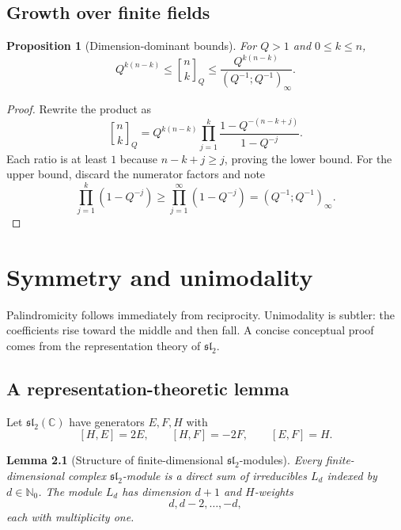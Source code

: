 \documentclass[11pt,oneside,openany]{book}
\newtheorem{lemma}[lemma]{Lemma}
\newtheorem{proposition}[proposition]{Proposition}
\theoremstyle{definition}
\theoremstyle{remark}
\newcommand{\Qbinom}[3]{\genfrac{[}{]}{0pt}{}{#1}{#2}_{#3}}
\newcommand{\C}{\mathbb C}
\newcommand{\N}{\mathbb N}
\begin{document}
\section{Growth over finite fields}

\begin{proposition}[Dimension-dominant bounds]\label{prop:qbinom-growth}
For $Q>1$ and $0\le k\le n$,
\[
 Q^{k(n-k)}
 \le \Qbinom nkQ
 \le \frac{Q^{k(n-k)}}{(Q^{-1};Q^{-1})_\infty}.
\]
\end{proposition}

\begin{proof}
Rewrite the product as
\[
 \Qbinom nkQ
 =Q^{k(n-k)}
 \prod_{j=1}^{k}\frac{1-Q^{-(n-k+j)}}{1-Q^{-j}}.
\]
Each ratio is at least $1$ because $n-k+j\ge j$, proving the lower bound.  For the upper bound, discard the numerator factors and note
\[
 \prod_{j=1}^{k}(1-Q^{-j})\ge\prod_{j=1}^{\infty}(1-Q^{-j})=(Q^{-1};Q^{-1})_\infty.
\]
\end{proof}

\chapter{Symmetry and unimodality}\label{chap:unimodality}

Palindromicity follows immediately from reciprocity.  Unimodality is subtler: the coefficients rise toward the middle and then fall.  A concise conceptual proof comes from the representation theory of $\mathfrak{sl}_2$.

\section{A representation-theoretic lemma}

Let $\mathfrak{sl}_2(\C)$ have generators $E,F,H$ with
\[
 [H,E]=2E,\qquad [H,F]=-2F,\qquad [E,F]=H.
\]

\begin{lemma}[Structure of finite-dimensional $\mathfrak{sl}_2$-modules]\label{lem:sl2-structure}
Every finite-dimensional complex $\mathfrak{sl}_2$-module is a direct sum of irreducibles $L_d$ indexed by $d\in\N_0$.  The module $L_d$ has dimension $d+1$ and $H$-weights
\[
 d,d-2,\dots,-d,
\]
each with multiplicity one.
\end{lemma}
\end{document}
